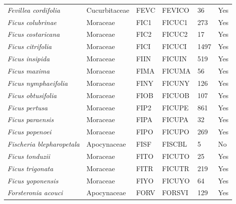 \documentclass[11pt]{article}
\begin{document}
\begin{longtable}{@{}llllll@{}}
\textit{Fevillea cordifolia}                          & Cucurbitaceae    & FEVC   & FEVICO & 36              & Yes       \\
\textit{Ficus colubrinae}                             & Moraceae         & FIC1   & FICUC1 & 273             & Yes       \\
\textit{Ficus costaricana}                            & Moraceae         & FIC2   & FICUC2 & 17              & Yes       \\
\textit{Ficus citrifolia}                             & Moraceae         & FICI   & FICUCI & 1497            & Yes       \\
\textit{Ficus insipida}                               & Moraceae         & FIIN   & FICUIN & 519             & Yes       \\
\textit{Ficus maxima}                                 & Moraceae         & FIMA   & FICUMA & 56              & Yes       \\
\textit{Ficus nymphaeifolia}                          & Moraceae         & FINY   & FICUNY & 126             & Yes       \\
\textit{Ficus obtusifolia}                            & Moraceae         & FIOB   & FICUOB & 107             & Yes       \\
\textit{Ficus pertusa}                                & Moraceae         & FIP2   & FICUPE & 861             & Yes       \\
\textit{Ficus paraensis}                              & Moraceae         & FIPA   & FICUPA & 32              & Yes       \\
\textit{Ficus popenoei}                               & Moraceae         & FIPO   & FICUPO & 269             & Yes       \\
\textit{Fischeria blepharopetala}                     & Apocynaceae      & FISF   & FISCBL & 5               & No        \\
\textit{Ficus tonduzii}                               & Moraceae         & FITO   & FICUTO & 25              & Yes       \\
\textit{Ficus trigonata}                              & Moraceae         & FITR   & FICUTR & 219             & Yes       \\
\textit{Ficus yoponensis}                             & Moraceae         & FIYO   & FICUYO & 64              & Yes       \\
\textit{Forsteronia acouci}                           & Apocynaceae      & FORV   & FORSVI & 129             & Yes       \\

\end{longtable}
\end{document}
